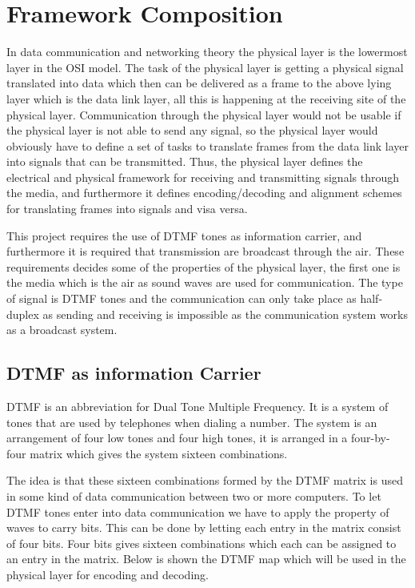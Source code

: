 \section{Framework Composition}\label{sec:physical_analysis} 
In data communication and networking theory the physical layer is the lowermost
layer in the OSI model\cite{KOM}. The task of the physical layer is getting a physical signal 
translated into data which then can be delivered as a frame to the above lying layer 
which is the data link layer, all this is happening at the receiving site of the physical
layer. Communication through the physical layer would not be usable if the physical layer 
is not able to send any signal, so the physical layer would obviously have to define a set 
of tasks to translate frames from the data link layer into signals that can be transmitted. 
Thus, the physical layer defines the electrical and physical framework for receiving and 
transmitting signals through the media, and furthermore it defines encoding/decoding 
and alignment schemes for translating frames into signals and visa versa.

This project requires the use of DTMF tones as information carrier, and furthermore it is
required that transmission are broadcast through the air. These requirements decides some
of the properties of the physical layer, the first one is the media which is the air as 
sound waves are used for communication. The type of signal is DTMF tones and the communication can
only take place as half-duplex as sending and receiving is impossible as the communication system works
as a broadcast system.

	\subsection{DTMF as information Carrier}
	DTMF is an abbreviation for Dual Tone Multiple Frequency. It is a system of tones that are used by
	telephones when dialing a number. The system is an arrangement of four low tones and four high tones,
	it is arranged in a four-by-four matrix which gives the system sixteen combinations.
	
	The idea is that these sixteen combinations formed by the DTMF matrix is used in some kind of data
	communication between two or more computers. To let DTMF tones enter into data communication we have
	to apply the property of  waves to carry bits. This can be done by letting each entry in the matrix
	consist of four bits. Four bits gives sixteen combinations which each can be assigned to an entry in
	the matrix. Below is shown the DTMF map which will be used in the physical layer for encoding and decoding.
	
